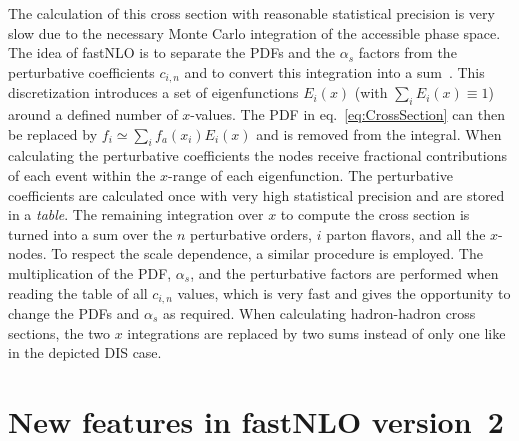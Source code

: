 \documentclass{DISproc}
\begin{document}
The calculation of this cross section with reasonable statistical
precision is very slow due to the necessary Monte Carlo integration of
the accessible phase space.  The idea of fastNLO is to separate
the PDFs and the $\alpha_s$ factors from the perturbative coefficients
$c_{i,n}$ and to convert this integration into a
sum~\cite{Pascaud:1994vx,Wobisch:00}.  This discretization introduces
a set of eigenfunctions $E_i(x)$ (with $\sum_i E_i(x) \equiv 1$) around
a defined number of $x$-values.  The PDF in eq.\ \ref{eq:CrossSection}
can then be replaced by $f_i \simeq \sum_i f_a(x_i) E_i(x)$ and is
removed from the integral.  When calculating the perturbative
coefficients the nodes receive fractional contributions of each event
within the $x$-range of each eigenfunction. The perturbative
coefficients are calculated once with very high statistical precision
and are stored in a \emph{table}.  The remaining integration over $x$
to compute the cross section is turned into a sum over the $n$
perturbative orders, $i$ parton flavors, and all the $x$-nodes.  To
respect the scale dependence, a similar procedure is employed.
The multiplication of the PDF, $\alpha_s$,
and the perturbative factors are performed when reading the table of
all $c_{i,n}$ values, which is very fast and gives the opportunity to
change the PDFs and $\alpha_s$ as required.  When calculating
hadron-hadron cross sections, the two $x$ integrations %
are replaced by two sums instead of only one like in the
depicted DIS case.



\section{New features in fastNLO version~2}
\end{document}
